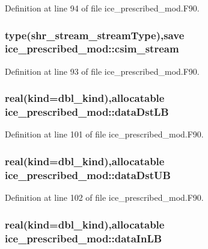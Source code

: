 Definition at line 94 of file ice\_\-prescribed\_\-mod.F90.\hypertarget{namespaceice__prescribed__mod_ae8eb8307f8c4017094a64d99000f458d}{
\subsubsection[{csim\_\-stream}]{\setlength{\rightskip}{0pt plus 5cm}type(shr\_\-stream\_\-streamType),save {\bf ice\_\-prescribed\_\-mod::csim\_\-stream}}}
\label{namespaceice__prescribed__mod_ae8eb8307f8c4017094a64d99000f458d}


Definition at line 93 of file ice\_\-prescribed\_\-mod.F90.\hypertarget{namespaceice__prescribed__mod_a69b2adaed2ac02b269e8c3c1d6b44178}{
\subsubsection[{dataDstLB}]{\setlength{\rightskip}{0pt plus 5cm}real(kind=dbl\_\-kind),allocatable {\bf ice\_\-prescribed\_\-mod::dataDstLB}}}
\label{namespaceice__prescribed__mod_a69b2adaed2ac02b269e8c3c1d6b44178}


Definition at line 101 of file ice\_\-prescribed\_\-mod.F90.\hypertarget{namespaceice__prescribed__mod_a07af024321e34db28532c6834a352da3}{
\subsubsection[{dataDstUB}]{\setlength{\rightskip}{0pt plus 5cm}real(kind=dbl\_\-kind),allocatable {\bf ice\_\-prescribed\_\-mod::dataDstUB}}}
\label{namespaceice__prescribed__mod_a07af024321e34db28532c6834a352da3}


Definition at line 102 of file ice\_\-prescribed\_\-mod.F90.\hypertarget{namespaceice__prescribed__mod_a7b605d560be8c1903b0df4b66076f31a}{
\subsubsection[{dataInLB}]{\setlength{\rightskip}{0pt plus 5cm}real(kind=dbl\_\-kind),allocatable {\bf ice\_\-prescribed\_\-mod::dataInLB}}}
\label{namespaceice__prescribed__mod_a7b605d560be8c1903b0df4b66076f31a}


